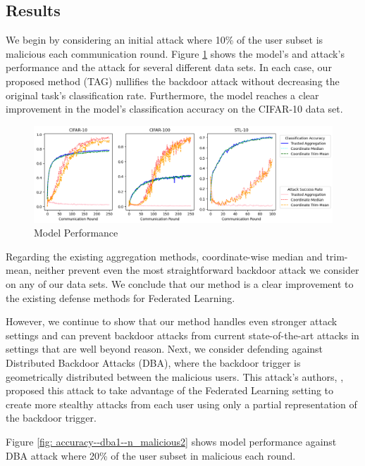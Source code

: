 \documentclass{article} %
\begin{document}
%
\subsection{Results}

We begin by considering an initial attack where 10\% of the user subset is malicious each communication round. Figure \ref{fig: accuracy--n_malicious1} shows the model's and attack's performance and the attack for several different data sets. In each case, our proposed method (TAG) nullifies the backdoor attack without decreasing the original task's classification rate. Furthermore, the model reaches a clear improvement in the model's classification accuracy on the CIFAR-10 data set.

\begin{figure}[H]
    \centering
    \includegraphics[width=\textwidth]{make_article/make_visuals/visuals/accuracy--n_malicious1--dba0--beta0.2.png}
    \caption{Model Performance }
    \label{fig: accuracy--n_malicious1}
\end{figure}

Regarding the existing aggregation methods, coordinate-wise median and trim-mean, neither prevent even the most straightforward backdoor attack we consider on any of our data sets. We conclude that our method is a clear improvement to the existing defense methods for Federated Learning.

However, we continue to show that our method handles even stronger attack settings and can prevent backdoor attacks from current state-of-the-art attacks in settings that are well beyond reason. Next, we consider defending against Distributed Backdoor Attacks (DBA), where the backdoor trigger is geometrically distributed between the malicious users. This attack's authors, \cite{dba}, proposed this attack to take advantage of the Federated Learning setting to create more stealthy attacks from each user using only a partial representation of the backdoor trigger. 

Figure \ref{fig: accuracy--dba1--n_malicious2} shows model performance against DBA attack where 20\% of the user subset in malicious each round.
\end{document}
